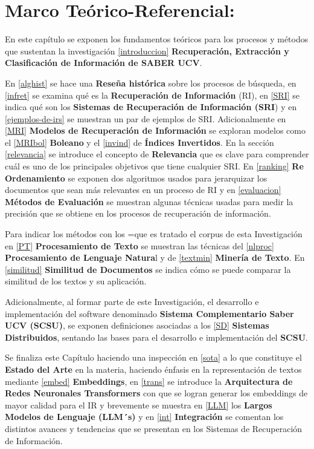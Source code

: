 \documentclass[
  10,
  openany]{book}
\begin{document}
\hypertarget{teorico}{%
\chapter{Marco Teórico-Referencial:}\label{teorico}}

En este capítulo se exponen los fundamentos teóricos para los procesos y métodos que sustentan la investigación \ref{introduccion} \textbf{Recuperación, Extracción y Clasificación de Información de SABER UCV}.

En \ref{alghist} se hace una \textbf{Reseña histórica} sobre los procesos de búsqueda, en \ref{infret} se examina qué es la \textbf{Recuperación de Información} (RI), en \ref{SRI} se indica qué son los \textbf{Sistemas de Recuperación de Información (SRI}) y en \ref{ejemplos-de-irs} se muestran un par de ejemplos de SRI. Adicionalmente en \ref{MRI} \textbf{Modelos de Recuperación de Información} se exploran modelos como el \ref{MRIbol} \textbf{Boleano} y el \ref{invind} de \textbf{Índices Invertidos}. En la sección \ref{relevancia} se introduce el concepto de \textbf{Relevancia} que es clave para comprender cuál es uno de los principales objetivos que tiene cualquier SRI. En \ref{ranking} \textbf{Re Ordenamiento} se exponen dos algoritmos usados para jerarquizar los documentos que sean más relevantes en un proceso de RI y en \ref{evaluacion} \textbf{Métodos de Evaluación} se muestran algunas técnicas usadas para medir la precisión que se obtiene en los procesos de recuperación de información.

Para indicar los métodos con los =que es tratado el corpus de esta Investigación en \ref{PT} \textbf{Procesamiento de Texto} se muestran las técnicas del \ref{nlproc} \textbf{Procesamiento de Lenguaje Natura}l y de \ref{textmin} \textbf{Minería de Texto}. En \ref{similitud} \textbf{Similitud de Documentos} se indica cómo se puede comparar la similitud de los textos y su aplicación.

Adicionalmente, al formar parte de este Investigación, el desarrollo e implementación del software denominado \textbf{Sistema Complementario Saber UCV (SCSU)}, se exponen definiciones asociadas a los \ref{SD} \textbf{Sistemas Distribuidos}, sentando las bases para el desarrollo e implementación del \textbf{SCSU}.

Se finaliza este Capítulo haciendo una inspección en \ref{sota} a lo que constituye el \textbf{Estado del Arte} en la materia, haciendo énfasis en la representación de textos mediante \ref{embed} \textbf{Embeddings}, en \ref{trans} se introduce la \textbf{Arquitectura de} \textbf{Redes Neuronales Transformers} con que se logran generar los embeddings de mayor calidad para el IR y brevemente se muestra en \ref{LLM} los \textbf{Largos Modelos de Lenguaje (LLM´s)} y en \ref{int} \textbf{Integración} se comentan los distintos avances y tendencias que se presentan en los Sistemas de Recuperación de Información.
\end{document}
